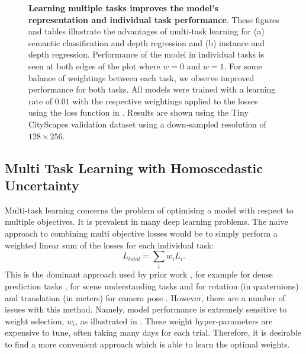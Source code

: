 {\begin{landscape}
\begin{figure}[t]
   \caption[Effect of loss weighting in multi-task learning.]{\textbf{Learning multiple tasks improves the model's representation and individual task performance}. These figures and tables illustrate the advantages of multi-task learning for (a) semantic classification and depth regression and (b) instance and depth regression. Performance of the model in individual tasks is seen at both edges of the plot where $w=0$ and $w=1$. For some balance of weightings between each task, we observe improved performance for both tasks. All models were trained with a learning rate of $0.01$ with the respective weightings applied to the losses using the loss function in . Results are shown using the Tiny CityScapes validation dataset using a down-sampled resolution of $128\times256$.}
\label{fig:scale_factor}
\end{figure}
\end{landscape}
\clearpage%
}


\subsection{Multi Task Learning with Homoscedastic Uncertainty}
\label{sec:multitask}

Multi-task learning concerns the problem of optimising a model with respect to multiple objectives. It is prevalent in many deep learning problems. The naive approach to combining multi objective losses would be to simply perform a weighted linear sum of the losses for each individual task:
\begin{equation}
\label{eqn:basic_loss}
L_{total}= \sum_i w_i L_{i}.
\end{equation}
This is the dominant approach used by prior work \cite{teichmann2016multinet,sermanet2013overfeat,liao2016understand,uhrig2016pixel}, for example for dense prediction tasks \cite{kokkinos2016ubernet}, for scene understanding tasks \cite{eigen2015predicting} and for rotation (in quaternions) and translation (in meters) for camera pose \cite{kendall2015posenet}. However, there are a number of issues with this method. Namely, model performance is extremely sensitive to weight selection, $w_i$, as illustrated in . These weight hyper-parameters are expensive to tune, often taking many days for each trial. Therefore, it is desirable to find a more convenient approach which is able to learn the optimal weights.

